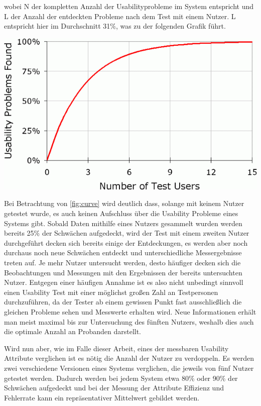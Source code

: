 wobei N der kompletten Anzahl der Usabilityprobleme im System entspricht und L der Anzahl der entdeckten Probleme nach dem Test mit einem Nutzer.
L entspricht hier im Durchschnitt 31\%, was zu der folgenden Grafik führt.  \cite{Nielsen.1993}

\begin{center}
  \includegraphics[width=0.7\linewidth]{figures/curve1.png}
  \label{fig:curve}
\end{center}

Bei Betrachtung von \ref{fig:curve} wird deutlich dass, solange mit keinem Nutzer getestet wurde, es auch keinen Aufschluss über die Usability Probleme eines Systems gibt.
Sobald Daten mithilfe eines Nutzers gesammelt wurden werden bereits 25\% der Schwächen aufgedeckt, wird der Test mit einem zweiten Nutzer durchgeführt decken sich bereits einige der Entdeckungen, es werden aber noch durchaus noch neue Schwächen entdeckt und unterschiedliche Messergebnisse treten auf.
Je mehr Nutzer untersucht werden, desto häufiger decken sich die Beobachtungen und Messungen mit den Ergebnissen der bereits untersuchten Nutzer.\cite{.h}
Entgegen einer häufigen Annahme ist es also nicht unbedingt sinnvoll einen Usability Test mit einer möglichst großen Zahl an Testpersonen durchzuführen, da der Tester ab einem gewissen Punkt fast ausschließlich die gleichen Probleme sehen und Messwerte erhalten wird.
Neue Informationen erhält man meist maximal bis zur Untersuchung des fünften Nutzers, weshalb dies auch die optimale Anzahl an Probanden darstellt.

Wird nun aber, wie im Falle dieser Arbeit, eines der messbaren Usability Attribute verglichen ist es nötig die Anzahl der Nutzer zu verdoppeln.
Es werden zwei verschiedene Versionen eines Systems verglichen, die jeweils von fünf Nutzer getestet werden.
Dadurch werden bei jedem System etwa 80\% oder 90\% der Schwächen aufgedeckt und bei der Messung der Attribute Effizienz und Fehlerrate kann ein repräsentativer Mittelwert gebildet werden.

